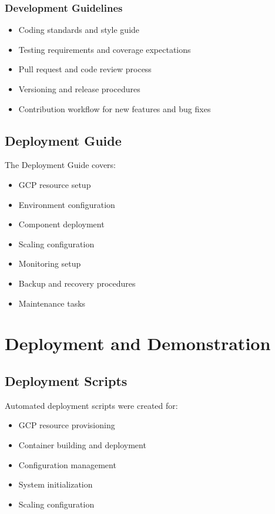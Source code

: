 \documentclass[12pt,a4paper]{report}
\begin{document}
\subsection{Development Guidelines}
\begin{itemize}
    \item Coding standards and style guide
    \item Testing requirements and coverage expectations
    \item Pull request and code review process
    \item Versioning and release procedures
    \item Contribution workflow for new features and bug fixes
\end{itemize}

\section{Deployment Guide}
The Deployment Guide covers:
\begin{itemize}
    \item GCP resource setup
    \item Environment configuration
    \item Component deployment
    \item Scaling configuration
    \item Monitoring setup
    \item Backup and recovery procedures
    \item Maintenance tasks
\end{itemize}

\chapter{Deployment and Demonstration}

\section{Deployment Scripts}
Automated deployment scripts were created for:
\begin{itemize}
    \item GCP resource provisioning
    \item Container building and deployment
    \item Configuration management
    \item System initialization
    \item Scaling configuration
\end{itemize}
\end{document}
